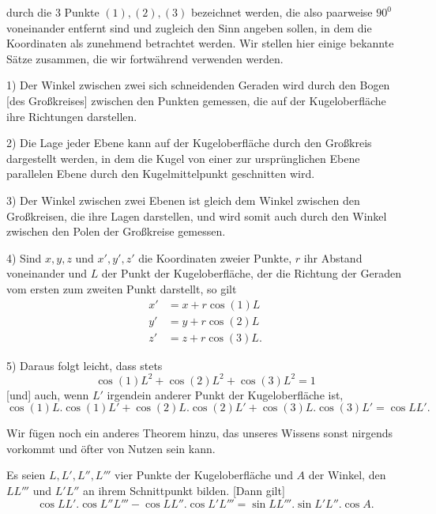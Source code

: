 %
durch die $3$ Punkte $(1),(2),(3)$ bezeichnet werden, die also paarweise $90^{0}$ voneinander entfernt sind und zugleich den Sinn angeben sollen, in dem die Koordinaten als zunehmend betrachtet werden. Wir stellen hier einige bekannte Sätze zusammen, die wir fortwährend verwenden werden.

1) Der Winkel zwischen zwei sich schneidenden Geraden wird durch den Bogen [des Großkreises] zwischen den Punkten gemessen, die auf der Kugeloberfläche ihre Richtungen darstellen.

2) Die Lage jeder Ebene kann auf der Kugeloberfläche durch den Großkreis dargestellt werden, in dem die Kugel von einer zur ursprünglichen Ebene parallelen Ebene durch den Kugelmittelpunkt geschnitten wird.

3) Der Winkel zwischen zwei Ebenen ist gleich dem Winkel zwischen den Großkreisen, die ihre Lagen darstellen, und wird somit auch durch den Winkel zwischen den Polen der Großkreise gemessen.

4) Sind $x,y,z$ und $x',y',z'$ die Koordinaten zweier Punkte, $r$ ihr Abstand voneinander und $L$ der Punkt der Kugeloberfläche, der die Richtung der Geraden vom ersten zum zweiten Punkt darstellt, so gilt
\[
\begin{aligned}
x'&=x+r\cos(1)L\\
y'&=y+r\cos(2)L\\
z'&=z+r\cos(3)L.
\end{aligned}
\]
\par\noindent\hspace*{1.2em}5) Daraus folgt leicht, dass stets
\[
\cos(1)L^{2}+\cos(2)L^{2}+\cos(3)L^{2}=1
\]
[und] auch, wenn $L'$ irgendein anderer Punkt der Kugeloberfläche ist,
\[
\cos(1)L.\cos(1)L'+\cos(2)L.\cos(2)L'+\cos(3)L.\cos(3)L'=\cos LL'.
\]

Wir fügen noch ein anderes Theorem hinzu, das unseres Wissens sonst nirgends vorkommt und öfter von Nutzen sein kann.

Es seien $L,L',L'',L'''$ vier Punkte der Kugeloberfläche und $A$ der Winkel, den $LL'''$ und $L'L''$ an ihrem Schnittpunkt bilden. [Dann gilt]
\[
\cos LL'.\cos L''L'''-\cos LL''.\cos L'L'''=\sin LL'''.\sin L'L''.\cos A.
\]
